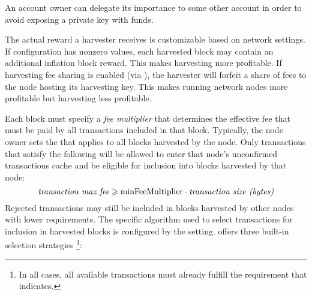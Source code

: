 An account owner can delegate its importance to some other account in order to avoid exposing a private key with funds.

The actual reward a harvester receives is customizable based on network settings.
If  configuration has nonzero values, each harvested block may contain an additional inflation block reward.
This makes harvesting more profitable.
If harvesting fee sharing is enabled (via ), the harvester will forfeit a share of fees to the node hosting its harvesting key.
This makes running network nodes more profitable but harvesting less profitable.


Each block must specify a \textit{fee multiplier} that determines the effective fee that must be paid by all transactions included in that block.
Typically, the node owner sets the  that applies to all blocks harvested by the node.
Only transactions that satisfy the following will be allowed to enter that node's unconfirmed transactions cache and be eligible for inclusion into blocks harvested by that node:
\begin{equation}
\textit{transaction max fee} \geqslant \nemsetting{node}{minFeeMultiplier} \cdot \textit{transaction size (bytes)}
\end{equation}
Rejected transactions may still be included in blocks harvested by other nodes with lower requirements.
The specific algorithm used to select transactions for inclusion in harvested blocks is configured by the  setting.
\codenamespace offers three built-in selection strategies
\footnote{In all cases, all available transactions must already fulfill the requirement that  indicates.}:

